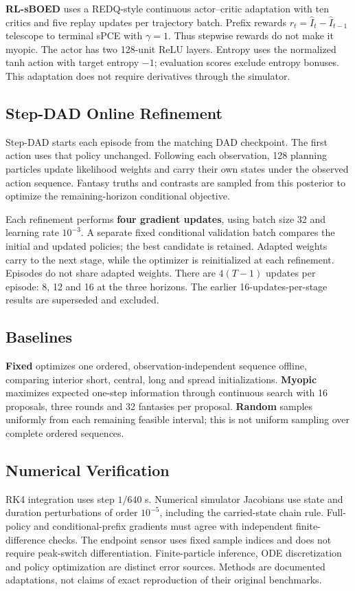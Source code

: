 \documentclass[conference]{IEEEtran}
\begin{document}
\textbf{RL-sBOED} uses a REDQ-style continuous actor--critic adaptation with
ten critics and five replay updates per trajectory batch. Prefix rewards
$r_t=\widehat I_t-\widehat I_{t-1}$ telescope to terminal sPCE with
$\gamma=1$. Thus stepwise rewards do not make it myopic. The actor has two
128-unit ReLU layers. Entropy uses the normalized tanh action with target
entropy $-1$; evaluation scores exclude entropy bonuses. This adaptation
does not require derivatives through the simulator.

\subsection{Step-DAD Online Refinement}
Step-DAD starts each episode from the matching DAD checkpoint. The first
action uses that policy unchanged. Following each observation, 128 planning
particles update likelihood weights and carry their own states under the
observed action sequence. Fantasy truths and contrasts are sampled from
this posterior to optimize the remaining-horizon conditional objective.

Each refinement performs \textbf{four gradient updates}, using batch size
32 and learning rate $10^{-3}$. A separate fixed conditional validation
batch compares the initial and updated policies; the best candidate is
retained. Adapted weights carry to the next stage, while the optimizer is
reinitialized at each refinement. Episodes do not share adapted weights.
There are $4(T-1)$ updates per episode: 8, 12 and 16 at the three horizons.
The earlier 16-updates-per-stage results are superseded and excluded.

\subsection{Baselines}
\textbf{Fixed} optimizes one ordered, observation-independent sequence
offline, comparing interior short, central, long and spread initializations.
\textbf{Myopic} maximizes expected one-step information through continuous
search with 16 proposals, three rounds and 32 fantasies per proposal.
\textbf{Random} samples uniformly from each remaining feasible interval;
this is not uniform sampling over complete ordered sequences.

\subsection{Numerical Verification}
RK4 integration uses step $1/640$ s. Numerical simulator Jacobians use
state and duration perturbations of order $10^{-5}$, including the
carried-state chain rule. Full-policy and conditional-prefix gradients
must agree with independent finite-difference checks. The endpoint sensor
uses fixed sample indices and does not require peak-switch differentiation.
Finite-particle inference, ODE discretization and policy optimization are
distinct error sources. Methods are documented adaptations, not claims of
exact reproduction of their original benchmarks.
\end{document}
